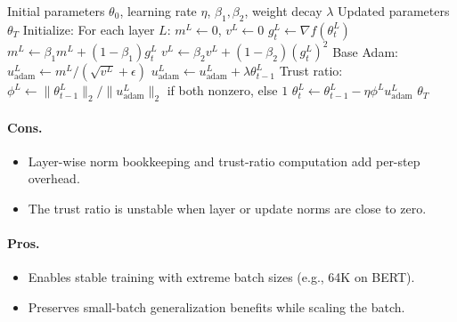 \begin{algorithm}[H]
\caption{LAMB (Layer-wise Adaptive Moments optimizer for Batch training)}
\label{alg:lamb}
\begin{algorithmic}[1]
\Require Initial parameters $\theta_0$, learning rate $\eta$, $\beta_1, \beta_2$, weight decay $\lambda$
\Ensure Updated parameters $\theta_T$
\State Initialize: For each layer $L$: $m^L \gets 0$, $v^L \gets 0$
        \State $g_t^L \gets \nabla f(\theta_t^L)$
        \State $m^L \gets \beta_1 m^L + (1-\beta_1) g_t^L$
        \State $v^L \gets \beta_2 v^L + (1-\beta_2) (g_t^L)^2$
        \State Base Adam: $u_{\text{adam}}^L \gets m^L / (\sqrt{v^L} + \epsilon)$
            \State $u_{\text{adam}}^L \gets u_{\text{adam}}^L + \lambda \theta_{t-1}^L$
        \EndIf
        \State Trust ratio: $\phi^L \gets \|\theta_{t-1}^L\|_2 / \|u_{\text{adam}}^L\|_2$ if both nonzero, else $1$
        \State $\theta_t^L \gets \theta_{t-1}^L - \eta \phi^L u_{\text{adam}}^L$
    \EndFor
\EndFor
\Return $\theta_T$
\end{algorithmic}
\end{algorithm}

\paragraph{Cons.}
\begin{itemize}[leftmargin=*]
\item Layer-wise norm bookkeeping and trust-ratio computation add per-step overhead.
\item The trust ratio is unstable when layer or update norms are close to zero.
\end{itemize}

\paragraph{Pros.}
\begin{itemize}[leftmargin=*]
\item Enables stable training with extreme batch sizes (e.g., 64K on BERT).
\item Preserves small-batch generalization benefits while scaling the batch.
\end{itemize}


